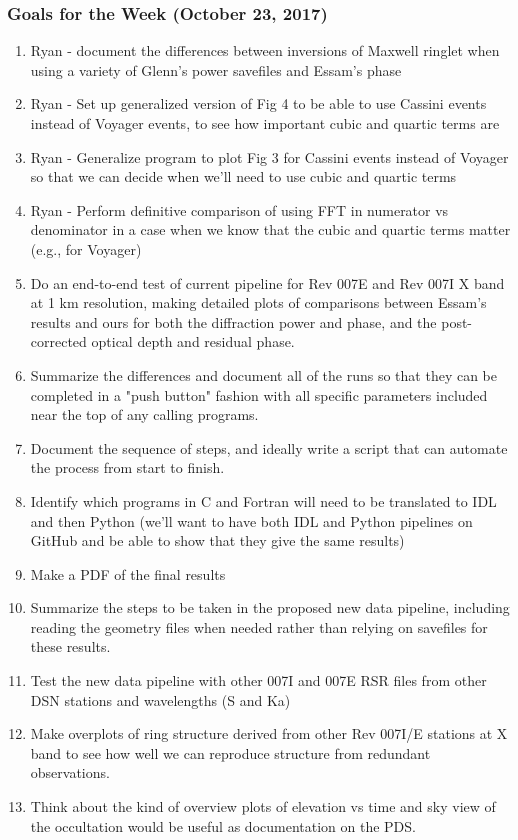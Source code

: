 \documentclass[crop=false,class=article,oneside]{standalone}
\begin{document}
\subsubsection{\footnotesize Goals for the Week (October 23, 2017)}
\begin{enumerate}
    \item Ryan - document the differences between inversions of Maxwell ringlet when using a variety of Glenn's power savefiles and Essam's phase
    \item Ryan - Set up generalized version of Fig 4 to be able to use Cassini events instead of Voyager events, to see how important cubic and quartic terms are
    \item Ryan - Generalize program to plot Fig 3 for Cassini events instead of Voyager so that we can decide when we'll need to use cubic and quartic terms
    \item Ryan - Perform definitive comparison of using FFT in numerator vs denominator in a case when we know that the cubic and quartic terms matter (e.g., for Voyager)
    \item Do an end-to-end test of current pipeline for Rev 007E and Rev 007I X band at 1 km resolution, making detailed plots of comparisons between Essam's results and ours for both the diffraction power and phase, and the post-corrected optical depth and residual phase. 
    \item Summarize the differences and document all of the runs so that they can be completed in a "push button" fashion with all specific parameters included near the top of any calling programs. 
    \item Document the sequence of steps, and ideally write a script that can automate the process from start to finish. 
    \item Identify which programs in C and Fortran will need to be translated to IDL and then Python (we'll want to have both IDL and Python pipelines on GitHub and be able to show that they give the same results)
    \item Make a PDF of the final results
    \item Summarize the steps to be taken in the proposed new data pipeline, including reading the geometry files when needed rather than relying on savefiles for these results.
    \item Test the new data pipeline with other 007I and 007E RSR files from other DSN stations and wavelengths (S and Ka)
    \item Make overplots of ring structure derived from other Rev 007I/E stations at X band to see how well we can reproduce structure from redundant observations.
    \item Think about the kind of overview plots of elevation vs time and sky view of the occultation would be useful as documentation on the PDS.
\end{enumerate}
\end{document}
